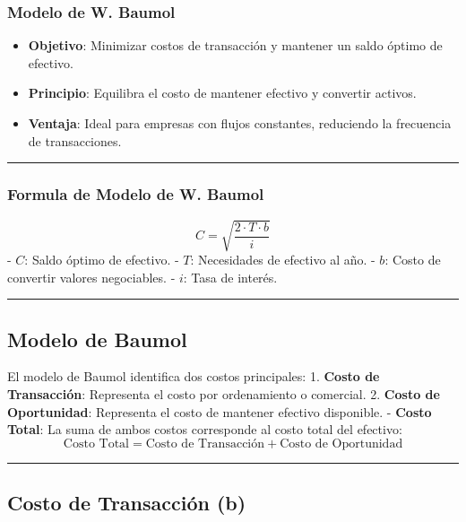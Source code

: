 \documentclass[
  letterpaper,
  DIV=11,
  numbers=noendperiod]{scrartcl}
\providecommand{\tightlist}{%
  \setlength{\itemsep}{0pt}\setlength{\parskip}{0pt}}\usepackage{longtable,booktabs,array}
\begin{document}
\subsubsection{Modelo de W. Baumol}\label{modelo-de-w.-baumol}

\begin{itemize}
\tightlist
\item
  \textbf{Objetivo}: Minimizar costos de transacción y mantener un saldo
  óptimo de efectivo.
\item
  \textbf{Principio}: Equilibra el costo de mantener efectivo y
  convertir activos.
\item
  \textbf{Ventaja}: Ideal para empresas con flujos constantes,
  reduciendo la frecuencia de transacciones.
\end{itemize}

\begin{center}\rule{0.5\linewidth}{0.5pt}\end{center}

\subsubsection{Formula de Modelo de W.
Baumol}\label{formula-de-modelo-de-w.-baumol}

\[ 
C = \sqrt{\frac{2 \cdot T \cdot b}{i}}
\] - \(C\): Saldo óptimo de efectivo. - \(T\): Necesidades de efectivo
al año. - \(b\): Costo de convertir valores negociables. - \(i\): Tasa
de interés.

\begin{center}\rule{0.5\linewidth}{0.5pt}\end{center}

\subsection{Modelo de Baumol}\label{modelo-de-baumol}

El modelo de Baumol identifica dos costos principales: 1. \textbf{Costo
de Transacción}: Representa el costo por ordenamiento o comercial. 2.
\textbf{Costo de Oportunidad}: Representa el costo de mantener efectivo
disponible. - \textbf{Costo Total}: La suma de ambos costos corresponde
al costo total del efectivo: \[
\text{Costo Total} = \text{Costo de Transacción} + \text{Costo de Oportunidad} 
\]

\begin{center}\rule{0.5\linewidth}{0.5pt}\end{center}

\subsection{Costo de Transacción (b)}\label{costo-de-transacciuxf3n-b}
\end{document}
